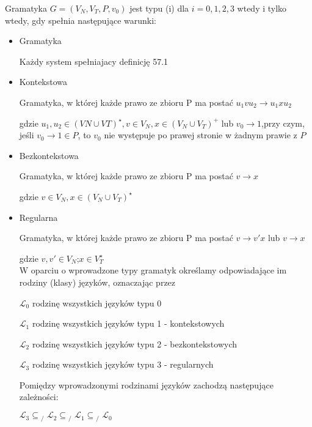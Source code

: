 \documentclass[main.tex]{subfiles}
\begin{document}
    \begin{definition}
        Gramatyka $G=(V_N,V_T,P,v_0)$ jest typu (i) dla $i=0,1,2,3$ wtedy i tylko wtedy, gdy spełnia następujące warunki:

        \begin{itemize}
            \item Gramatyka

            Każdy system spełniajacy definicję 57.1
            \item Kontekstowa

            Gramatyka, w której każde prawo ze zbioru P ma postać $u_1 v u_2 \rightarrow u_1 x u_2$

            gdzie $u_1,u_2 \in (VN \cup VT)^\star,v \in V_N,x \in (V_N \cup V_T)^+$ lub $v_0 \rightarrow 1$,przy czym, jeśli $v_0 \rightarrow 1 \in P$, to $v_0$ nie występuje po prawej stronie w żadnym prawie z $P$

            \item Bezkontekstowa

            Gramatyka, w której każde prawo ze zbioru P ma postać
            $v \rightarrow x$

            gdzie $v \in V_N, x \in (V_N \cup V_T)^\star$

            \item Regularna

            Gramatyka, w której każde prawo ze zbioru P ma postać
            $v \rightarrow v'x$ lub $v \rightarrow x$

            gdzie $v,v' \in V_N$;$x \in V_T^\star$
            \\


            W oparciu o wprowadzone typy gramatyk określamy odpowiadające im rodziny (klasy) języków, oznaczając przez

            $\mathbf{\mathcal{L}}_{0}$ rodzinę wszystkich języków typu 0

            $\mathbf{\mathcal{L}}_{1}$ rodzinę wszystkich języków typu 1 - kontekstowych

            $\mathbf{\mathcal{L}}_{2}$ rodzinę wszystkich języków typu 2 - bezkontekstowych

            $\mathbf{\mathcal{L}}_{3}$ rodzinę wszystkich języków typu 3 - regularnych

            Pomiędzy wprowadzonymi rodzinami języków zachodzą następujące zależności:

            $\mathbf{\mathcal{L}}_{3}\subseteq \! \! \! \! \! _{/\; \, }\mathbf{\mathcal{L}}_{2}\subseteq \! \! \! \! \! _{/\; \, }\mathbf{\mathcal{L}} _{1}\subseteq \! \! \! \! \! _{/\; \, }\mathbf{\mathcal{L}}_{0}$

        \end{itemize}

    \end{definition}
\end{document}
